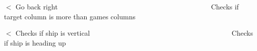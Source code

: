 $<$ Go back right ~\newline
~\newline
~\newline
~\newline
~\newline
~\newline
~\newline
~\newline
~\newline
~\newline
~\newline
~\newline
~\newline
~\newline
~\newline
~\newline
~\newline
~\newline
~\newline
~\newline
~\newline
~\newline
~\newline
~\newline
~\newline
~\newline
 Checks if target column is more than game\textquotesingle{}s columns

$<$ Checks if ship is vertical ~\newline
~\newline
~\newline
~\newline
~\newline
~\newline
~\newline
~\newline
~\newline
~\newline
~\newline
~\newline
~\newline
~\newline
~\newline
~\newline
~\newline
~\newline
~\newline
~\newline
~\newline
~\newline
~\newline
~\newline
 Checks if ship is heading up

